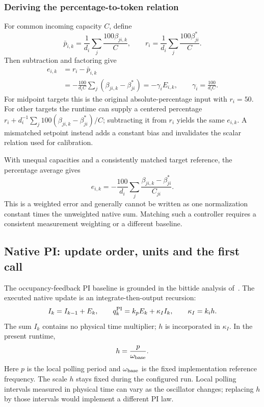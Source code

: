 \subsubsection{Deriving the percentage-to-token relation}
For common incoming capacity $C$, define
\[
 \bar p_{i,k}=\frac1{d_i}\sum_j\frac{100\beta_{ji,k}}{C},\qquad
 r_i=\frac1{d_i}\sum_j\frac{100\beta^*_{ji}}{C}.
\]
Then subtraction and factoring give
\begin{align}
 e_{i,k}&=r_i-\bar p_{i,k}\\
 &=-\frac{100}{d_iC}\sum_j(\beta_{ji,k}-\beta^*_{ji})
 =-\gamma_i E_{i,k},\qquad \gamma_i=\frac{100}{d_iC}.
 \label{detail:eq:fpi_percent}
\end{align}
For midpoint targets this is the original absolute-percentage input with
$r_i=50$. For other targets the runtime can supply a centered percentage
$r_i+d_i^{-1}\sum_j100(\beta_{ji,k}-\beta^*_{ji})/C$; subtracting it from
$r_i$ yields the same $e_{i,k}$. A mismatched setpoint instead adds a
constant bias and invalidates the scalar relation used for calibration.

With unequal capacities and a consistently matched target reference, the
percentage average gives
\[
 e_{i,k}=-\frac{100}{d_i}\sum_j
 \frac{\beta_{ji,k}-\beta^*_{ji}}{C_{ji}}.
\]
This is a weighted error and generally cannot be written as one normalization constant
times the unweighted native sum. Matching such a controller requires a
consistent measurement weighting or a different baseline.

\subsection{Native PI: update order, units and the first call}

The occupancy-feedback PI baseline is grounded in the bittide analysis
of~\cite{lall2022resistance}. The executed native update is an
integrate-then-output recursion:
\begin{equation}
 I_k=I_{k-1}+E_k,\qquad
 q_k^{\rm PI}=k_pE_k+\kappa_I I_k,\qquad \kappa_I=k_i h.
 \label{detail:eq:fpi_native}
\end{equation}
The sum $I_k$ contains no physical time multiplier; $h$ is incorporated in
$\kappa_I$. In the present runtime,
\begin{equation}
 h=\frac{p}{\omega_{\rm base}}.
 \label{detail:eq:fpd_h}
\end{equation}
Here $p$ is the local polling period and $\omega_{\rm base}$ is the fixed implementation reference frequency. The scale $h$ stays fixed during the configured run. Local polling intervals measured
in physical time can vary as the oscillator changes; replacing $h$ by
those intervals would implement a different PI law.

